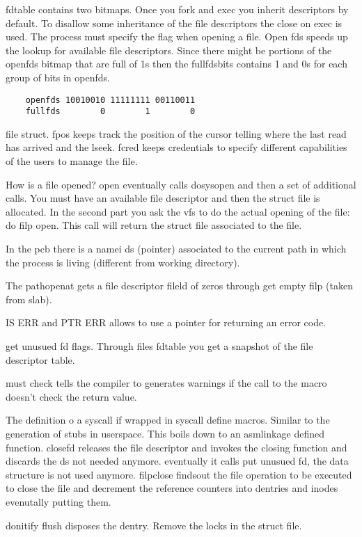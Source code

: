 \documentclass[twoside]{article}
\begin{document}
fdtable contains two bitmaps. Once you fork and exec you inherit descriptors by
default. To disallow some inheritance of the file descriptors the close on exec
is used. The process must specify the flag when opening a file. Open fds speeds
up the lookup for available file descriptors. Since there might be portions of
the openfds bitmap that are full of 1s then the fullfdsbits contains 1 and 0s
for each group of bits in openfds.

\begin{verbatim}
    openfds 10010010 11111111 00110011
    fullfds        0        1        0
\end{verbatim}

file struct. fpos keeps track the position of the cursor telling where the last
read has arrived and the lseek. fcred keeps credentials to specify different
capabilities of the users to manage the file.

How is a file opened? open eventually calls dosysopen and then a set of
additional calls. You must have an available file descriptor and then the struct
file is allocated. In the second part you ask the vfs to do the actual opening
of the file: do filp open. This call will return the struct file associated to
the file. 

In the pcb there is a namei ds (pointer) associated to the current path in which
the process is living (different from working directory). 

The pathopenat gets a file descriptor fileld of zeros through get empty filp
(taken from slab).

IS ERR and PTR ERR allows to use a pointer for returning an error code.

get unusued fd flags. Through files fdtable you get a snapshot of the file
descriptor table.

must check tells the compiler to  generates warnings if the
call to the macro doesn't check the return value.

The definition o a syscall if wrapped in syscall define macros. Similar to the
generation of stubs in userspace. This boils down to an asmlinkage defined
function. closefd releases the file descriptor and invokes the closing function
and discards the ds not needed anymore. eventually it calls put unusued fd, the
data structure is not used anymore. filpclose findsout the file operation to be
executed to close the file and decrement the reference counters into dentries
and inodes evenutally putting them.

donitify flush disposes the dentry. Remove the locks in the struct file.
\end{document}
